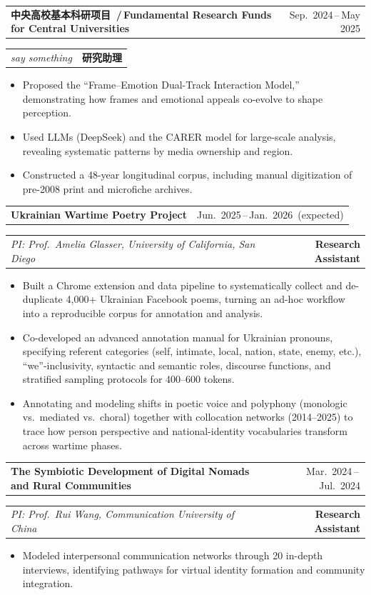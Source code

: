 \documentclass[a4paper,11pt]{article}
\makeatletter
\newcommand{\entryhead}[2]{%
  \par\vspace{6pt}
  \noindent\begin{tabularx}{\linewidth}{@{}X r@{}}
    {\large\bfseries\color{body}#1} & {\small\color{muted}\sffamily #2} \\
  \end{tabularx}\par\vspace{2pt}
}
\newcommand{\entrymeta}[2]{%
  \noindent\begin{tabularx}{\linewidth}{@{}X r@{}}
    {\normalsize\itshape\color{body} #1} & {\small\color{muted}\textbf{#2}} \\
  \end{tabularx}\par\vspace{4pt}
}
\makeatother
\begin{document}
\entryhead{中央高校基本科研项目 \normalfont\textcolor{muted}{\,/\,Fundamental Research Funds for Central Universities}}{Sep.\ 2024\,--\,May 2025}
\entrymeta{say something}{\textbf{研究助理}}
\begin{itemize}
  \item Proposed the ``Frame--Emotion Dual-Track Interaction Model,'' demonstrating how frames and emotional appeals co-evolve to shape perception.
  \item Used LLMs (DeepSeek) and the CARER model for large-scale analysis, revealing systematic patterns by media ownership and region.
  \item Constructed a 48-year longitudinal corpus, including manual digitization of pre-2008 print and microfiche archives.
\end{itemize}

\entryhead{Ukrainian Wartime Poetry Project}{Jun.\ 2025\,--\,Jan.\ 2026 \,(expected)}
\entrymeta{PI: Prof.\ Amelia Glasser, University of California, San Diego}{\textbf{Research Assistant}}
\begin{itemize}
  \item Built a Chrome extension and data pipeline to systematically collect and de-duplicate 4{,}000+ Ukrainian Facebook poems, turning an ad-hoc workflow into a reproducible corpus for annotation and analysis.
  \item Co-developed an advanced annotation manual for Ukrainian pronouns, specifying referent categories (self, intimate, local, nation, state, enemy, etc.), ``we''-inclusivity, syntactic and semantic roles, discourse functions, and stratified sampling protocols for 400--600 tokens.
  \item Annotating and modeling shifts in poetic voice and polyphony (monologic vs.\ mediated vs.\ choral) together with collocation networks (2014--2025) to trace how person perspective and national-identity vocabularies transform across wartime phases.
\end{itemize}

\entryhead{The Symbiotic Development of Digital Nomads and Rural Communities}{Mar.\ 2024\,--\,Jul.\ 2024}
\entrymeta{PI: Prof.\ Rui Wang, Communication University of China}{\textbf{Research Assistant}}
\begin{itemize}
  \item Modeled interpersonal communication networks through 20 in-depth interviews, identifying pathways for virtual identity formation and community integration.
\end{itemize}
\end{document}
